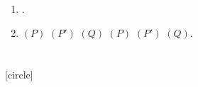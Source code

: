 \documentclass{article}
\begin{document}
\subsection{ }
\begin{frame}{ }
\begin{exampleblock}{}
\begin{enumerate}\rightskip\leftm

\item 
                 .

\item
	    $(P)$   $(P')$        
                      $(Q)$     
                $(P)$   $(P')$       $(Q)$.


\end{enumerate}
\end{exampleblock}
\end{frame}

\section{ }

[circle]
\end{document}
